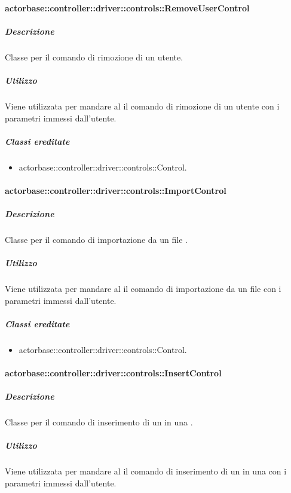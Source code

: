 \documentclass{scalatekids-article}
\begin{document}
\paragraph{actorbase::controller::driver::controls::RemoveUserControl}

\subparagraph{Descrizione}

Classe per il comando di rimozione di un utente.

\subparagraph{Utilizzo}

Viene utilizzata per mandare al  il comando di rimozione di un
utente con i parametri immessi dall'utente.

\subparagraph{Classi ereditate}

\begin{itemize}
\item actorbase::controller::driver::controls::Control.
\end{itemize}

\paragraph{actorbase::controller::driver::controls::ImportControl}

\subparagraph{Descrizione}

Classe per il comando di importazione da un file .

\subparagraph{Utilizzo}

Viene utilizzata per mandare al  il comando di importazione da
un file  con i parametri immessi dall'utente.

\subparagraph{Classi ereditate}

\begin{itemize}
\item actorbase::controller::driver::controls::Control.
\end{itemize}

\paragraph{actorbase::controller::driver::controls::InsertControl}

\subparagraph{Descrizione}

Classe per il comando di inserimento di un  in una .

\subparagraph{Utilizzo}

Viene utilizzata per mandare al  il comando di inserimento di un
 in una  con i parametri immessi dall'utente.
\end{document}
